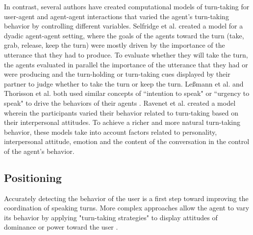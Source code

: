 \documentclass[twocolumn]{svjour3}
\begin{document}
In contrast, several authors have created computational models of turn-taking for user-agent and agent-agent interactions that varied the agent's turn-taking behavior by controlling 
different variables. 
Selfridge et al. \citep{selfridge_bidding_2009} created a model for a dyadic agent-agent setting, where the goals of the agents toward the turn (take, grab, release, keep the turn) were mostly driven by the importance of the utterance that they had to produce. To evaluate whether they will take the turn, the agents evaluated in parallel the importance of the utterance that they had or were producing and the turn-holding or turn-taking cues displayed by their partner to judge whether to take the turn or keep the turn. Le{\ss}mann et al. \citep{lessmann_towards_2004} and Thorisson et al. \citep{thorisson_multiparty_2010} both used similar concepts of ``intention to speak" \citep{lessmann_towards_2004} or ``urgency to speak" to drive the behaviors of their agents \citep{thorisson_multiparty_2010}. Ravenet et al. \citep{ravenet_conversational_2015} created a model wherein the participants varied their behavior related to turn-taking based on their interpersonal attitudes. To achieve a richer and more natural turn-taking behavior, these models take into account factors related to personality, interpersonal attitude, emotion and the content of the conversation in the control of the agent's behavior. 

\subsection{Positioning}

Accurately detecting the behavior of the user is a first step toward improving the coordination of speaking turns. More complex approaches allow the agent to vary its behavior by applying "turn-taking strategies" \citep{ter_maat_how_2010} to display attitudes of dominance or power toward the user \citep{ravenet_conversational_2015,cafaro_effects_2016}. 
\end{document}
